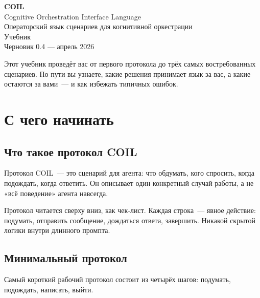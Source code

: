 \documentclass[11pt,a4paper]{article}
\begin{document}

\begin{center}
{\Huge\bfseries\color{coilblue} COIL}\\[6pt]
{\Large Cognitive Orchestration Interface Language}\\[12pt]
{\large\color{coilgray} Операторский язык сценариев для когнитивной оркестрации}\\[6pt]
{\color{coilgray} Учебник}\\[6pt]
{\small\color{coilgray} Черновик 0.4 --- апрель 2026}
\end{center}

\vspace{1em}

Этот учебник проведёт вас от первого протокола до трёх самых востребованных сценариев. По пути вы узнаете, какие решения принимает язык за вас, а какие остаются за вами~--- и как избежать типичных ошибок.

\tableofcontents
\newpage


\section{С чего начинать}

\subsection{Что такое протокол COIL}

Протокол COIL~--- это сценарий для агента: что обдумать, кого спросить, когда подождать, когда ответить. Он описывает один конкретный случай работы, а не «всё поведение» агента навсегда.

Протокол читается сверху вниз, как чек-лист. Каждая строка~--- явное действие: подумать, отправить сообщение, дождаться ответа, завершить. Никакой скрытой логики внутри длинного промпта.

\subsection{Минимальный протокол}

Самый короткий рабочий протокол состоит из четырёх шагов: подумать, подождать, написать, выйти.
\end{document}
